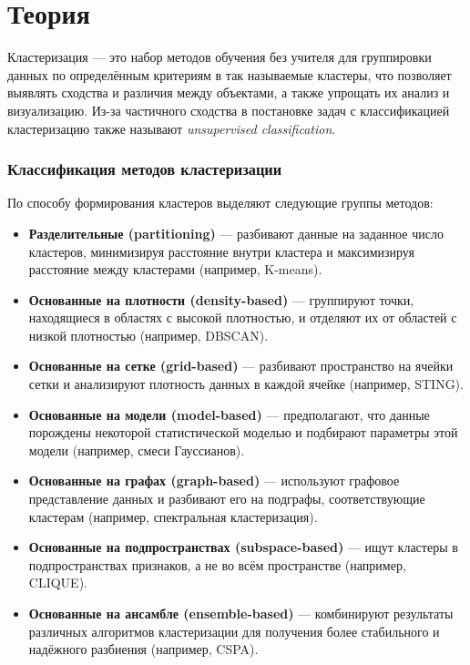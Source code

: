 \chapter{Теория}

Кластеризация — это набор методов обучения без учителя для группировки данных по определённым критериям в так называемые кластеры, что позволяет выявлять сходства и различия между объектами, а также упрощать их анализ и визуализацию. Из-за частичного сходства в постановке задач с классификацией кластеризацию также называют \textit{unsupervised classification}.

\subsection*{Классификация методов кластеризации}

По способу формирования кластеров выделяют следующие группы методов:

\begin{itemize}
    \item \textbf{Разделительные (partitioning)} — разбивают данные на заданное число кластеров, минимизируя расстояние внутри кластера и максимизируя расстояние между кластерами (например, K-means).
    
    \item \textbf{Основанные на плотности (density-based)} — группируют точки, находящиеся в областях с высокой плотностью, и отделяют их от областей с низкой плотностью (например, DBSCAN).
    
    \item \textbf{Основанные на сетке (grid-based)} — разбивают пространство на ячейки сетки и анализируют плотность данных в каждой ячейке (например, STING).
    
    \item \textbf{Основанные на модели (model-based)} — предполагают, что данные порождены некоторой статистической моделью и подбирают параметры этой модели (например, смеси Гауссианов).
    
    \item \textbf{Основанные на графах (graph-based)} — используют графовое представление данных и разбивают его на подграфы, соответствующие кластерам (например, спектральная кластеризация).
    
    \item \textbf{Основанные на подпространствах (subspace-based)} — ищут кластеры в подпространствах признаков, а не во всём пространстве (например, CLIQUE).
    
    \item \textbf{Основанные на ансамбле (ensemble-based)} — комбинируют результаты различных алгоритмов кластеризации для получения более стабильного и надёжного разбиения (например, CSPA).
\end{itemize}

